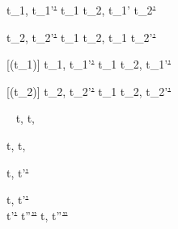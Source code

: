   {t_1,\Sigma {} t_1'\st{'} }
  {t_1 \Or t_2,\Sigma {} t_1' \Or t_2\st{'}}

  {t_2,\Sigma {} t_2'\st{'} }
  {t_1 \Or t_2,\Sigma {} t_1 \Or t_2'\st{'}}


[\Failing(t_1)]
  {t_1,\Sigma {} t_1'\st{'}}
  {t_1 \Xor t_2,\Sigma {} t_1'\st{'}}

[\Failing(t_2)]
  {t_2,\Sigma {} t_2'\st{'}}
  {t_1 \Xor t_2,\Sigma {} t_2'\st{'}}

  {\ }
  {t,\Sigma \handle{\Pick \Here} t,\Sigma}












  { }
  {t,\Sigma {} t,\Sigma}





  {t,\Sigma {} t'\st{'}}


  {t,\Sigma   {} t'\st{'} \\
   t'\st{'} \normalise t''\st{''}}
  {t,\Sigma {} t''\st{''}}

